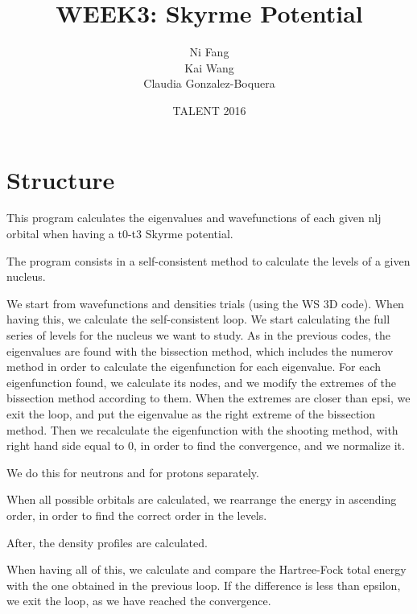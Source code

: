 \documentclass[a4paper,10pt]{article}
\title{WEEK3: Skyrme Potential}
\author{Ni Fang\\ Kai Wang\\Claudia Gonzalez-Boquera}
\date{TALENT 2016}
\begin{document}
\maketitle
\section{Structure}
This program calculates the eigenvalues and wavefunctions of each given nlj orbital when having a t0-t3 Skyrme potential.

The program consists in a self-consistent method to calculate the levels of a given nucleus.

We start from wavefunctions and densities trials (using the WS 3D code).  
When having this, we calculate the self-consistent loop.
We start calculating the full series of levels for the nucleus we want to study.
As in the previous codes, the eigenvalues are found with the bissection method, which includes the numerov 
method in order to calculate the eigenfunction for each eigenvalue. For each
eigenfunction found, we calculate its nodes, and we modify the extremes of the 
bissection method according to them. When the extremes are closer than epsi,
we exit the loop, and put the eigenvalue as the right extreme of the bissection
method. 
Then we recalculate the eigenfunction with the shooting method, with 
right hand side equal to 0, in order to find the convergence, and we normalize it. 

We do this for neutrons and for protons separately. 

When all possible orbitals are calculated, we rearrange the energy in ascending order, 
in order to find the correct order in the levels. 

After, the density profiles are calculated.

When having all of this, we calculate and compare the Hartree-Fock total energy with the one obtained in the 
previous loop. 
If the difference is less than epsilon, we exit the loop, as we have reached the convergence.
\end{document}
